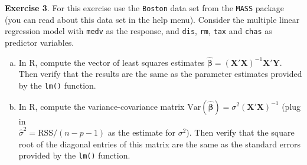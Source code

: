 \documentclass[11pt]{article}\usepackage[]{graphicx}\usepackage[]{color}
\newcommand{\Var}{\textrm{Var}}
\begin{document}
\textbf{Exercise 3}.  For this exercise use the \texttt{Boston} data set from the \texttt{MASS} package (you can read about this data set in the help menu).  Consider the multiple linear regression model with \texttt{medv} as the response, and \texttt{dis}, \texttt{rm}, \texttt{tax} and \texttt{chas} as predictor variables.
\begin{enumerate}[(a)]
\item In R, compute the vector of least squares estimates $\bm{\hat{\beta}} = \bm{(X'X)}^{-1}\bm{X'Y}$.  Then verify that the results are the same as the parameter estimates provided by the \texttt{lm()} function.
\item In R, compute the variance-covariance matrix $\Var(\bm{\hat{\beta}}) = \sigma^2 (\bm{X'X})^{-1}$ (plug in\\ $\hat{\sigma}^2 = \text{RSS} / (n-p-1)$ as the estimate for $\sigma^2$).  Then verify that the square root of the diagonal entries of this matrix are the same as the standard errors provided by the \texttt{lm()} function.  
\end{enumerate}
\end{document}
